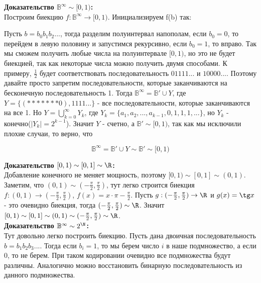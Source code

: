 \noindent \textbf{Доказательство $\mathbb{B}^{\infty} \sim [0, 1)$:} \\

Построим биекцию $f : \mathbb{B}^{\infty} \to [0, 1)$. Инициализируем f(b) так:

Пусть $b = b_0 b_1 b_2 ...$, тогда разделим полуинтервал напополам, если $b_0 = 0$, то перейдем в левую половину и запустимся рекурсивно,
если $b_0 = 1$, то вправо. Так мы сможем получить любые числа на полуинтервале $[0, 1)$, но это не будет биекцией, так как некоторые числа
можно получить двумя способами. К примеру, $\frac{1}{2}$ будет соответствовать последовательность $01111...$ и $10000...$. Поэтому давайте просто
запретим последовательности, которые заканчиваются на бесконечную последовательность 1. Тогда $\mathbb{B}^{\infty} = \mathbb{B}' \cup Y$, где
$Y = \{(*******0), 1111...\}$ - все последовательности, которые заканчиваются на все 1. Но $Y = \bigcup\limits_{k = 0}^{\infty} Y_k$,
где $Y_k = \{a_1, a_2, ..., a_{k - 1}, 0, 1, 1, 1, ...\}$, но $Y_k$ - конечно($|Y_k| = 2^{k-1}$). Значит $Y$ - счетно, а $\mathbb{B}' \sim [0, 1)$, так
как мы исключили плохие случаи, то верно, что

\begin{equation*}
    \mathbb{B}^{\infty} = \mathbb{B}' \cup Y \sim \mathbb{B}' \sim [0, 1)
\end{equation*}

\noindent \textbf{Доказательство $[0, 1) \sim [0, 1] \sim \R$:} \\

Добавление конечного не меняет мощность, поэтому $[0, 1) \sim [0, 1] \sim (0, 1)$. Заметим, что $(0, 1) \sim (-\frac{\pi}{2}, \frac{\pi}{2})$, тут
легко строится биекция $f : (0, 1) \to (-\frac{\pi}{2}, \frac{\pi}{2})$, $f(x) = x \cdot \pi - \frac{\pi}{2}$. Пусть $g : (-\frac{\pi}{2}, \frac{\pi}{2})
\to \R$ и $g(x) = \tg x$ - это очевидно биекция, тогда $(-\frac{\pi}{2}, \frac{\pi}{2}) \sim \R$. Значит $[0, 1) \sim [0, 1] \sim (0, 1) \sim (-\frac{\pi}{2}, \frac{\pi}{2}) \sim \R$.\\

\noindent \textbf{Доказательство $\mathbb{B}^{\infty} \sim 2^{\N}$:}\\

Тут довольно легко построить биекцию. Пусть дана двоичная последовательность $b = b_1 b_2 b_3 ...$. Тогда если $b_i = 1$, то мы берем число $i$ в наше
подмножество, а если $0$, то не берем. При таком кодировании очевидно все подмножества будут различны. Аналогично можно восстановить бинарную
последовательность из данного подмножества.\\

